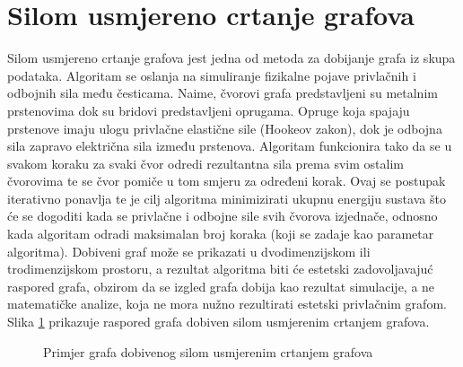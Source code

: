 \documentclass[times, utf8, zavrsni]{fer}
\begin{document}
\section{Silom usmjereno crtanje grafova}
\label{subchap:forcedir}
Silom usmjereno crtanje grafova jest jedna od metoda za dobijanje grafa iz skupa podataka. Algoritam se oslanja na simuliranje fizikalne pojave privlačnih i odbojnih sila među česticama. Naime, čvorovi grafa predstavljeni su metalnim prstenovima dok su bridovi predstavljeni oprugama. Opruge koja spajaju prstenove imaju ulogu privlačne elastične sile (Hookeov zakon), dok je odbojna sila zapravo električna sila između prstenova. Algoritam funkcionira tako da se u svakom koraku za svaki čvor odredi rezultantna sila prema svim ostalim čvorovima te se čvor pomiče u tom smjeru za određeni korak. Ovaj se postupak iterativno ponavlja te je cilj algoritma minimizirati ukupnu energiju sustava što će se dogoditi kada se privlačne i odbojne sile svih čvorova izjednače, odnosno kada algoritam odradi maksimalan broj koraka (koji se zadaje kao parametar algoritma). Dobiveni graf može se prikazati u dvodimenzijskom ili trodimenzijskom prostoru, a rezultat algoritma biti će estetski zadovoljavajuć raspored grafa, obzirom da se izgled grafa dobija kao rezultat simulacije, a ne matematičke analize, koja ne mora nužno rezultirati estetski privlačnim grafom. Slika \ref{img:fdgd_example} prikazuje raspored grafa dobiven silom usmjerenim crtanjem grafova.

\begin{figure}
\caption{Primjer grafa dobivenog silom usmjerenim crtanjem grafova}
\label{img:fdgd_example}
\end{figure}
\end{document}
